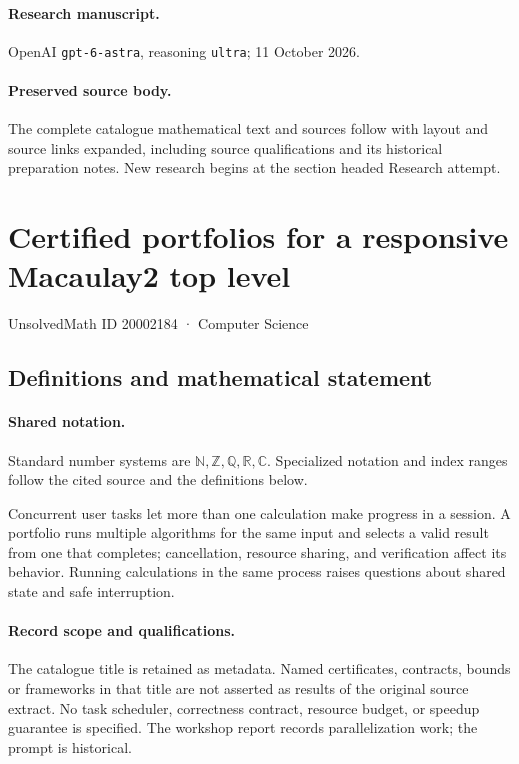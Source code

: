 \documentclass[11pt]{article}
\begin{document}
\paragraph{Research manuscript.} OpenAI \texttt{gpt-6-astra}, reasoning \texttt{ultra}; 11 October 2026.
\paragraph{Preserved source body.} The complete catalogue mathematical text and sources follow with layout and source links expanded, including source qualifications and its historical preparation notes. New research begins at the section headed Research attempt.

\section{Certified portfolios for a responsive Macaulay2 top level}\label{20002184}
{\small UnsolvedMath ID 20002184 · Computer Science}
\subsection{Definitions and mathematical statement}

\paragraph{Shared notation.}Standard number systems are $\mathbb N,\mathbb Z,\mathbb Q,\mathbb R,\mathbb C$. Specialized notation and index ranges follow the cited source and the definitions below.


Concurrent user tasks let more than one calculation make progress in a session. A portfolio runs multiple algorithms for the same input and selects a valid result from one that completes; cancellation, resource sharing, and verification affect its behavior. Running calculations in the same process raises questions about shared state and safe interruption.
\paragraph{Record scope and qualifications.}
The catalogue title is retained as metadata. Named certificates, contracts, bounds or frameworks in that title are not asserted as results of the original source extract.
No task scheduler, correctness contract, resource budget, or speedup guarantee is specified. The workshop report records parallelization work; the prompt is historical.
\end{document}
